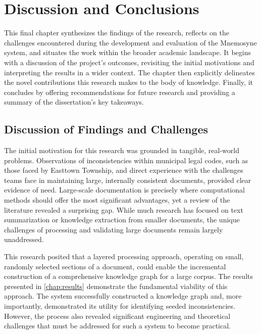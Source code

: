 \chapter{Discussion and Conclusions}
\label{chap:discussion}

This final chapter synthesizes the findings of the research, reflects on the challenges encountered during the development and evaluation of the Mnemosyne system, and situates the work within the broader academic landscape. It begins with a discussion of the project's outcomes, revisiting the initial motivations and interpreting the results in a wider context. The chapter then explicitly delineates the novel contributions this research makes to the body of knowledge. Finally, it concludes by offering recommendations for future research and providing a summary of the dissertation's key takeaways.

\section{Discussion of Findings and Challenges}
\label{sec:discussion}

The initial motivation for this research was grounded in tangible, real-world problems. Observations of inconsistencies within municipal legal codes, such as those faced by Easttown Township, and direct experience with the challenges teams face in maintaining large, internally consistent documents, provided clear evidence of need. Large-scale documentation is precisely where computational methods should offer the most significant advantages, yet a review of the literature revealed a surprising gap. While much research has focused on text summarization or knowledge extraction from smaller documents, the unique challenges of processing and validating large documents remain largely unaddressed.

This research posited that a layered processing approach, operating on small, randomly selected sections of a document, could enable the incremental construction of a comprehensive knowledge graph for a large corpus. The results presented in \cref{chap:results} demonstrate the fundamental viability of this approach. The system successfully constructed a knowledge graph and, more importantly, demonstrated its utility for identifying seeded inconsistencies. However, the process also revealed significant engineering and theoretical challenges that must be addressed for such a system to become practical.

